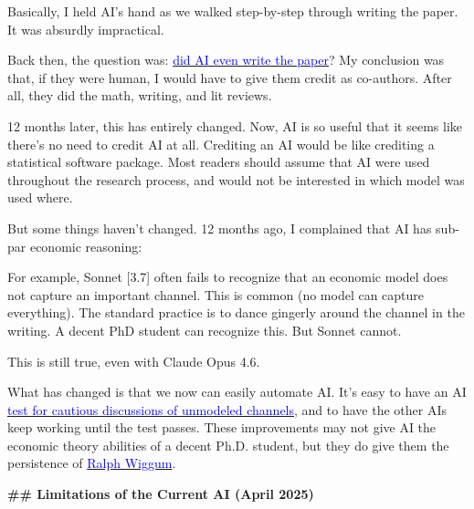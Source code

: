 \documentclass[12pt]{article}
\begin{document}
\begin{mdframed}[
linewidth=1pt,
linecolor=black,
innerleftmargin=0.25em,
innerrightmargin=0.25em,
innertopmargin=0.2\baselineskip,
innerbottommargin=0.8\baselineskip
]
Basically, I held AI's hand as we walked step-by-step through writing the paper. It was absurdly impractical.

Back then, the question was: \href{https://github.com/chenandrewy/Prompts-to-Paper?tab=readme-ov-file#the-paper-generation-process}{\textcolor{blue}{did AI even write the paper}}? My conclusion was that, if they were human, I would have to give them credit as co-authors. After all, they did the math, writing, and lit reviews.

12 months later, this has entirely changed. Now, AI is so useful that it seems like there's no need to credit AI at all. Crediting an AI would be like crediting a statistical software package. Most readers should assume that AI were used throughout the research process, and would not be interested in which model was used where.

But some things haven't changed. 12 months ago, I complained that AI has sub-par economic reasoning:

\begin{tcolorbox}[enhanced,breakable,colback=white,boxrule=0pt,frame hidden,sharp corners,left=0.9em,right=0em,top=0.15em,bottom=0.15em,before skip=0.75\baselineskip,after skip=0.6\baselineskip,borderline west={2pt}{0pt}{blue!45!black}]
\setlength{\parskip}{0.3em}
For example, Sonnet [3.7] often fails to recognize that an economic model does not capture an important channel. This is common (no model can capture everything). The standard practice is to dance gingerly around the channel in the writing. A decent PhD student can recognize this. But Sonnet cannot.
\end{tcolorbox}

This is still true, even with Claude Opus 4.6.

What has changed is that we now can easily automate AI. It's easy to have an AI \href{https://github.com/chenandrewy/ralph-wiggum-asset-pricing/blob/main/tests/theory-unmodeled-channels.py}{\textcolor{blue}{test for cautious discussions of unmodeled channels}}, and to have the other AIs keep working until the test passes. These improvements may not give AI the economic theory abilities of a decent Ph.D. student, but they do give them the persistence of \href{https://en.wikipedia.org/wiki/Ralph_Wiggum}{\textcolor{blue}{Ralph Wiggum}}.

\par
{\large\bfseries \textcolor{red!70!black}{\#\# Limitations of the Current AI (April 2025)}}
\par


\end{mdframed}
\end{document}
